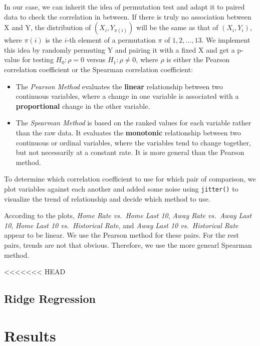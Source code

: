 \documentclass[]{article}
\begin{document}
In our case, we can inherit the idea of permutation test and adapt it to
paired data to check the correlation in between. If there is truly no
association between X and Y, the distribution of \((X_i, Y_{\pi(i)})\)
will be the same as that of \((X_i, Y_i)\), where \(\pi(i)\) is the
\(i\)-th element of a permutation \(\pi\) of \({1, 2, ..., 13}\). We
implement this idea by randomly permuting Y and pairing it with a fixed
X and get a p-value for testing \(H_0: \rho = 0\) versus
\(H_1: \rho \neq 0\), where \(\rho\) is either the Pearson correlation
coefficient or the Spearman correlation coefficient:

\begin{itemize}
\item
  The \emph{Pearson Method} evaluates the \textbf{linear} relationship
  between two continuous variables, where a change in one variable is
  associated with a \textbf{proportional} change in the other variable.
\item
  The \emph{Spearman Method} is based on the ranked values for each
  variable rather than the raw data. It evaluates the \textbf{monotonic}
  relationship between two continuous or ordinal variables, where the
  variables tend to change together, but not necessarily at a constant
  rate. It is more general than the Pearson method.
\end{itemize}

To determine which correlation coefficient to use for which pair of
comparison, we plot variables against each another and added some noise
using \texttt{jitter()} to visualize the trend of relationship and
decide which method to use.

According to the plots, \emph{Home Rate vs.~Home Last 10}, \emph{Away
Rate vs.~Away Last 10}, \emph{Home Last 10 vs.~Historical Rate}, and
\emph{Away Last 10 vs.~Historical Rate} appear to be linear. We use the
Pearson method for these pairs. For the rest pairs, trends are not that
obvious. Therefore, we use the more genearl Spearman method.

<<<<<<< HEAD
\hypertarget{ridge-regression}{%
\subsection{Ridge Regression}\label{ridge-regression}}

\hypertarget{results}{%
\section{Results}\label{results}}
\end{document}
